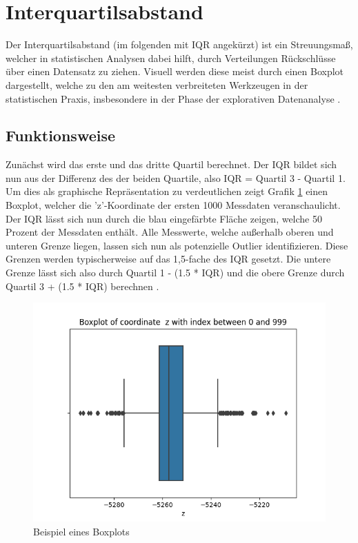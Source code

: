 \section{Interquartilsabstand}
Der Interquartilsabstand (im folgenden mit IQR angekürzt) ist ein Streuungsmaß, welcher in statistischen Analysen dabei hilft, durch Verteilungen Rückschlüsse über einen Datensatz zu ziehen. Visuell werden diese meist durch einen Boxplot dargestellt, welche zu den am weitesten verbreiteten Werkzeugen in der statistischen Praxis, insbesondere in der Phase der explorativen Datenanalyse \cite{dovoedoBoxplotBasedOutlierDetection2015}.
\subsection{Funktionsweise}
Zunächst wird das erste und das dritte Quartil berechnet. Der IQR bildet sich nun aus der Differenz des der beiden Quartile, also IQR = Quartil 3 - Quartil 1. Um dies als graphische Repräsentation zu verdeutlichen zeigt Grafik \ref{fig:boxplot_example} einen Boxplot, welcher die 'z'-Koordinate der ersten 1000 Messdaten veranschaulicht. Der IQR lässt sich nun durch die blau eingefärbte Fläche zeigen, welche 50 Prozent der Messdaten enthält. Alle Messwerte, welche außerhalb oberen und unteren Grenze liegen, lassen sich nun als potenzielle Outlier identifizieren. Diese Grenzen werden typischerweise auf das 1,5-fache des IQR gesetzt. Die untere Grenze lässt sich also durch Quartil 1 - (1.5 * IQR) und die obere Grenze durch Quartil 3 + (1.5 * IQR) berechnen \cite{vinuthaDetectionOutliersUsing2018}. 

\begin{figure}[h!]
	\includegraphics[width=\textwidth]{img/boxplot_example.png}
	\caption[Beispiel eines Boxplots]{Beispiel eines Boxplots}
	\label{fig:boxplot_example}
\end{figure}

